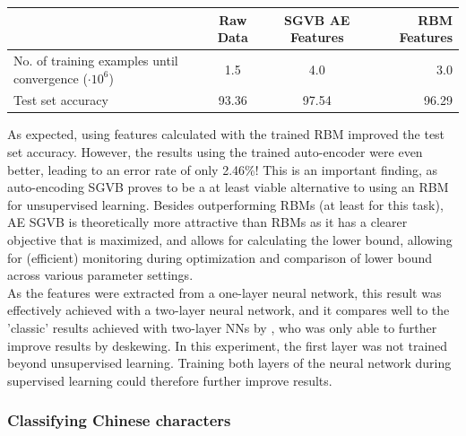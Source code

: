 \documentclass{article}
\begin{document}
\begin{table}
\begin{tabular}{|l|c|c|r|}
\hline
& Raw Data & SGVB AE Features & RBM Features \\ \hline
No. of training examples until convergence ($\cdot 10^6$) & 1.5 & 4.0 & 3.0 \\ \hline 
Test set accuracy & 93.36 & 97.54 & 96.29 \\ \hline
\end{tabular}
\end{table}

As expected, using features calculated with the trained RBM improved the test set accuracy. However, the results using the trained auto-encoder were even better, leading to an error rate of only 2.46\%! This is an important finding, as auto-encoding SGVB proves to be a at least viable alternative to using an RBM for unsupervised learning. Besides outperforming RBMs (at least for this task), AE SGVB is theoretically more attractive than RBMs as it has a clearer objective that is maximized, and allows for calculating the lower bound, allowing for (efficient) monitoring during optimization and comparison  of lower bound across various parameter settings.\\
As the features were extracted from a one-layer neural network, this result was effectively achieved with a two-layer neural network, and it compares well to the 'classic' results achieved with two-layer NNs by \cite{lecun1998gradient}, who was only able to further improve results by deskewing. In this experiment, the first layer was not trained beyond unsupervised learning. Training both layers of the neural network during supervised learning could therefore further improve results.

\subsubsection{Classifying Chinese characters}
\end{document}
